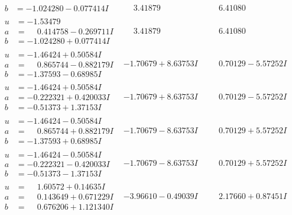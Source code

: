 \documentclass[1p]{elsarticle_modified}
\theoremstyle{definition}
\begin{document}
$$\begin{array}{c|c|c}
\begin{aligned}
b &= -1.024280 - 0.077414 I\end{aligned}
 & \phantom{-}3.41879\phantom{ +0.000000I} & \phantom{-}6.41080\phantom{ +0.000000I} \\ \hline\begin{aligned}
u &= -1.53479\phantom{ +0.000000I} \\
a &= \phantom{-}0.414758 - 0.269711 I \\
b &= -1.024280 + 0.077414 I\end{aligned}
 & \phantom{-}3.41879\phantom{ +0.000000I} & \phantom{-}6.41080\phantom{ +0.000000I} \\ \hline\begin{aligned}
u &= -1.46424 + 0.50584 I \\
a &= \phantom{-}0.865744 - 0.882179 I \\
b &= -1.37593 - 0.68985 I\end{aligned}
 & -1.70679 + 8.63753 I & \phantom{-}0.70129 - 5.57252 I \\ \hline\begin{aligned}
u &= -1.46424 + 0.50584 I \\
a &= -0.222321 + 0.420033 I \\
b &= -0.51373 + 1.37153 I\end{aligned}
 & -1.70679 + 8.63753 I & \phantom{-}0.70129 - 5.57252 I \\ \hline\begin{aligned}
u &= -1.46424 - 0.50584 I \\
a &= \phantom{-}0.865744 + 0.882179 I \\
b &= -1.37593 + 0.68985 I\end{aligned}
 & -1.70679 - 8.63753 I & \phantom{-}0.70129 + 5.57252 I \\ \hline\begin{aligned}
u &= -1.46424 - 0.50584 I \\
a &= -0.222321 - 0.420033 I \\
b &= -0.51373 - 1.37153 I\end{aligned}
 & -1.70679 - 8.63753 I & \phantom{-}0.70129 + 5.57252 I \\ \hline\begin{aligned}
u &= \phantom{-}1.60572 + 0.14635 I \\
a &= \phantom{-}0.143649 + 0.671229 I \\
b &= \phantom{-}0.676206 + 1.121340 I\end{aligned}
 & -3.96610 - 0.49039 I & \phantom{-}2.17660 + 0.87451 I \\ \hline\begin{aligned}

\end{aligned}
\end{array}$$
\end{document}
